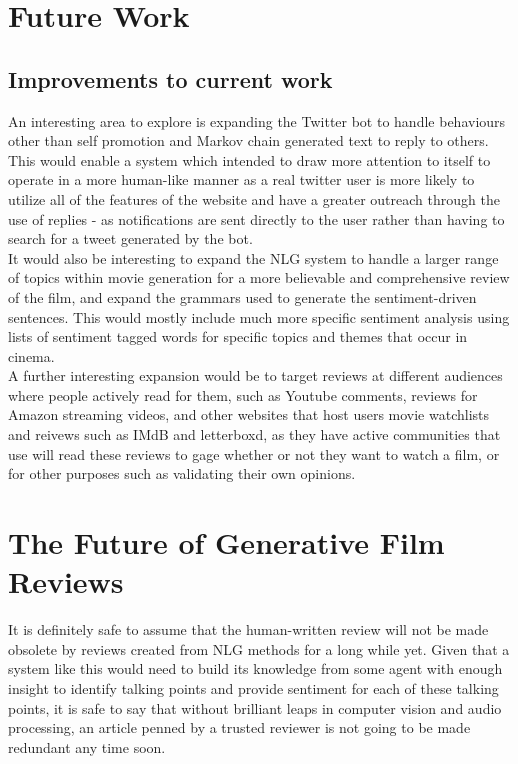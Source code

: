 \section{Future Work}


\subsection{Improvements to current work}
An interesting area to explore is expanding the Twitter bot to handle behaviours other than self promotion and Markov chain generated text to reply to others. This would enable a system which intended to draw more attention to itself to operate in a more human-like manner as a real twitter user is more likely to utilize all of the features of the website and have a greater outreach through the use of replies - as notifications are sent directly to the user rather than having to search for a tweet generated by the bot.\\


It would also be interesting to expand the NLG system to handle a larger range of topics within movie generation for a more believable and comprehensive review of the film, and expand the grammars used to generate the sentiment-driven sentences. This would mostly include much more specific sentiment analysis using lists of sentiment tagged words for specific topics and themes that occur in cinema.\\

A further interesting expansion would be to target reviews at different audiences where people actively read for them, such as Youtube comments, reviews for Amazon streaming videos, and other websites that host users movie watchlists and reivews such as IMdB and letterboxd, as they have active communities that use will read these reviews to gage whether or not they want to watch a film, or for other purposes such as validating their own opinions. 

\section{The Future of Generative Film Reviews}
It is definitely safe to assume that the human-written review will not be made obsolete by reviews created from NLG methods for a long while yet. Given that a system like this would need to build its knowledge from some agent with enough insight to identify talking points and provide sentiment for each of these talking points, it is safe to say that without brilliant leaps in computer vision and audio processing, an article penned by a trusted reviewer is not going to be made redundant any time soon.

